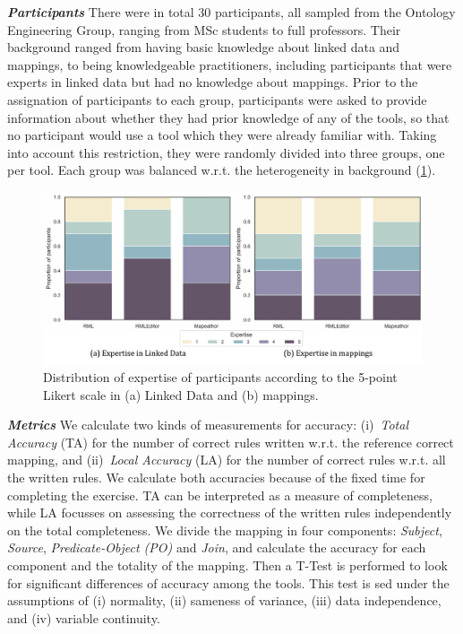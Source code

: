 \noindent\textit{\textbf{Participants}} 
There were in total 30 participants, all sampled from the Ontology Engineering Group, ranging from MSc students to full professors. Their background ranged from having basic knowledge about linked data and mappings, to being knowledgeable practitioners, including participants that were experts in linked data but had no knowledge about mappings. Prior to the assignation of participants to each group, participants were asked to provide information about whether they had prior knowledge of any of the tools, so that no participant would use a tool which they were already familiar with. Taking into account this restriction, they were randomly divided into three groups, one per tool. Each group was balanced w.r.t. the heterogeneity in background (\cref{fig:chp5-1_expertise}). 


\begin{figure}[!t]
\centering
\includegraphics[width=1\linewidth]{figures/chp5-1_expertise.pdf}
\caption[Expertise of participants of the user study]{Distribution of expertise of participants according to the 5-point Likert scale in (a) Linked Data and (b) mappings.}
\label{fig:chp5-1_expertise}
\end{figure}

\noindent\textit{\textbf{Metrics}} 
We calculate two kinds of measurements for accuracy: (i)~\textit{Total Accuracy} (TA) for the number of correct rules written w.r.t. the reference correct mapping, and (ii)~\textit{Local Accuracy} (LA) for the number of correct rules w.r.t. all the written rules. We calculate both accuracies because of the fixed time for completing the exercise. TA can be interpreted as a measure of completeness, while LA focusses on assessing the correctness of the written rules independently on the total completeness.
We divide the mapping in four components: \textit{Subject}, \textit{Source}, \textit{Predicate-Object (PO)} and \textit{Join}, and calculate the accuracy for each component and the totality of the mapping. Then a T-Test is performed to look for significant differences of accuracy among the tools. This test is sed under the assumptions of (i) normality, (ii) sameness of variance, (iii) data independence, and (iv) variable continuity.


